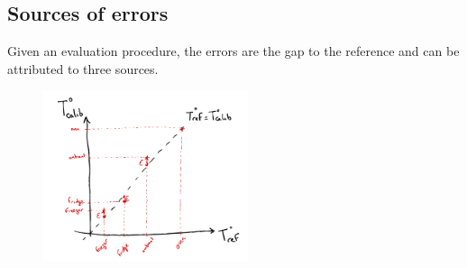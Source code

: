 \begin{bibunit}


 \subsection{Sources of errors}

Given an evaluation procedure, the errors are the gap to the reference and can be attributed to three sources.

\begin{figure}
\includegraphics[clip, width=6cm]{Introduction/pics/errors.png}  
\begin{tabular}{c |c|c}


\end{tabular}
\end{figure}
\end{bibunit}
